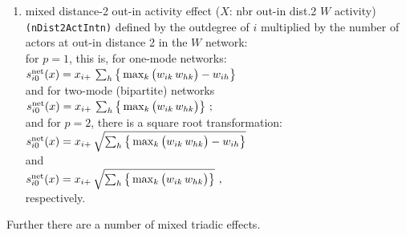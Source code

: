 \documentclass[a4paper,fleqn,11pt]{article}
\newcommand{\+}{\, + \,}
\newcommand{\vit}{\theenumi}
\newcounter{savenumi}
\begin{document}
\begin{enumerate}
\item
  mixed distance-2 out-in activity effect ($X$: nbr out-in dist.2 $W$ activity)  \texttt{(nDist2ActIntn)}
   defined by the outdegree of $i$
   multiplied by the number of actors at out-in distance 2 in the $W$ network:\\
   for $p=1$, this is, for one-mode networks:\\[0.4em]
 $s^{\rm net}_{i\vit}(x) =   x_{i+}\, \sum_h \big\{ \max_k \big(w_{ik} \, w_{hk}\big) - w_{ih} \big\}  $\\[0.4em]
 and for two-mode (bipartite) networks\\[0.4em]
 $s^{\rm net}_{i\vit}(x) =   x_{i+}\, \sum_h \big\{ \max_k \big(w_{ik} \, w_{hk}\big)  \big\} \ ; $\\[0.4em]
 and for $p=2$, there is a square root transformation:\\[0.4em]
 $s^{\rm net}_{i\vit}(x) =   x_{i+}\, \sqrt{ \sum_h \big\{ \max_k \big(w_{ik} \, w_{hk}\big) - w_{ih} \big\}}  $\\[0.4em]
 and \\[0.4em]
 $s^{\rm net}_{i\vit}(x) =   x_{i+}\,  \sqrt{ \sum_h \big\{ \max_k \big(w_{ik} \, w_{hk}\big)  \big\} }\ , $\\[0.4em]
 respectively.
\setcounter{savenumi}{\value{enumi}}

\end{enumerate}
\smallskip
Further there are a number of mixed triadic effects.
\end{document}
